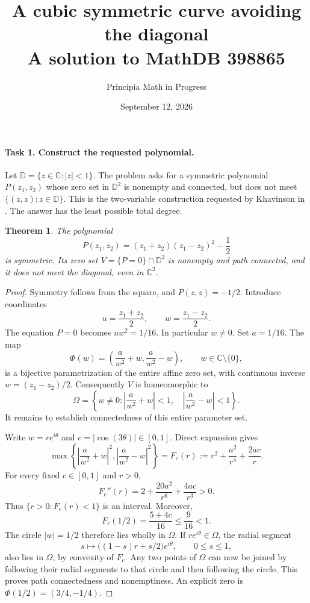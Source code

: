 \documentclass[11pt]{article}
\title{A cubic symmetric curve avoiding the diagonal\\
\large A solution to MathDB 398865}
\author{Principia Math in Progress}
\date{September 12, 2026}
\newcommand{\D}{\mathbb D}
\newcommand{\C}{\mathbb C}
\newtheorem{theorem}{Theorem}
\begin{document}
\maketitle

\paragraph{Task 1. Construct the requested polynomial.}
Let $\D=\{z\in\C:|z|<1\}$. The problem asks for a symmetric polynomial
$P(z_1,z_2)$ whose zero set in $\D^2$ is nonempty and connected, but does
not meet $\{(z,z):z\in\D\}$. This is the two-variable construction requested
by Khavinson in \cite[p.~381]{source}. The answer has the least
possible total degree.

\begin{theorem}
The polynomial
\[
\boxed{\quad P(z_1,z_2)=(z_1+z_2)(z_1-z_2)^2-\frac12 \quad}
\]
is symmetric. Its zero set $V=\{P=0\}\cap\D^2$ is nonempty and
path connected, and it does not meet the diagonal, even in $\C^2$.
\end{theorem}

\begin{proof}
Symmetry follows from the square, and $P(z,z)=-1/2$.
Introduce coordinates
\[
u=\frac{z_1+z_2}{2},\qquad w=\frac{z_1-z_2}{2}.
\]
The equation $P=0$ becomes $uw^2=1/16$. In particular $w\ne0$.
Set $a=1/16$. The map
\[
\Phi(w)=\left(\frac{a}{w^2}+w,\frac{a}{w^2}-w\right),\qquad w\in\C\setminus\{0\},
\]
is a bijective parametrization of the entire affine zero set, with
continuous inverse $w=(z_1-z_2)/2$. Consequently $V$ is homeomorphic to
\[
\Omega=\left\{w\ne0:
 \left|\frac{a}{w^2}+w\right|<1,\quad
 \left|\frac{a}{w^2}-w\right|<1\right\}.
\]
It remains to establish connectedness of this entire parameter set.

Write $w=re^{i\theta}$ and $c=|\cos(3\theta)|\in[0,1]$. Direct expansion gives
\begin{equation}\label{eq:radial}
\max\left\{\left|\frac{a}{w^2}+w\right|^2,
           \left|\frac{a}{w^2}-w\right|^2\right\}
=F_c(r):=r^2+\frac{a^2}{r^4}+\frac{2ac}{r}.
\end{equation}
For every fixed $c\in[0,1]$ and $r>0$,
\[
F_c''(r)=2+\frac{20a^2}{r^6}+\frac{4ac}{r^3}>0.
\]
Thus $\{r>0:F_c(r)<1\}$ is an interval. Moreover,
\[
F_c(1/2)=\frac{5+4c}{16}\le\frac9{16}<1.
\]
The circle $|w|=1/2$ therefore lies wholly in $\Omega$. If
$re^{i\theta}\in\Omega$, the radial segment
\[
s\longmapsto\bigl((1-s)r+s/2\bigr)e^{i\theta},
\qquad 0\le s\le1,
\]
also lies in $\Omega$, by convexity of $F_c$. Any two points of $\Omega$
can now be joined by following their radial segments to that circle and
then following the circle. This proves path connectedness and nonemptiness.
An explicit zero is $\Phi(1/2)=(3/4,-1/4)$.
\end{proof}
\end{document}
